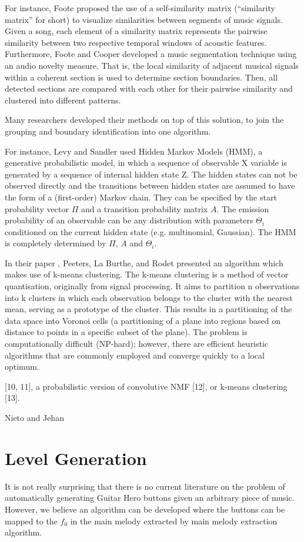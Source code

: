For instance, Foote \cite{Foote} proposed the use of a self-similarity matrix (“similarity matrix” for short) to visualize similarities between segments of music signals. Given a song, each element of a similarity matrix represents the pairwise similarity between two respective temporal windows of acoustic features. Furthermore, Foote and Cooper \cite{FooteCooper} developed a music segmentation technique using an audio novelty measure. That is, the local similarity of adjacent musical signals within a coherent section is used to determine section boundaries. Then, all detected sections are compared with each other for their pairwise similarity and clustered into different patterns.

Many researchers developed their methods on top of this solution, to join the grouping and boundary identification into one algorithm. 

For instance, Levy and Sandler used Hidden Markov Models (HMM), a generative probabilistic model, in which a sequence of observable X variable is generated by a sequence of internal hidden state Z. The hidden states can not be observed directly and the transitions between hidden states are assumed to have the form of a (first-order) Markov chain. They can be specified by the start probability vector $\Pi$ and a transition probability matrix $A$. The emission probability of an observable can be any distribution with parameters $\Theta_{i}$ conditioned on the current hidden state (e.g. multinomial, Gaussian). The HMM is completely determined by $\Pi$, $A$ and $\Theta_{i}$.

In their paper \cite{Peeters}, Peeters, La Burthe, and Rodet presented an algorithm which makes use of k-means clustering. The k-means clustering is a method of vector quantisation, originally from signal processing. It aims to partition n observations into k clusters in which each observation belongs to the cluster with the nearest mean, serving as a prototype of the cluster. This results in a partitioning of the data space into Voronoi cells (a partitioning of a plane into regions based on distance to points in a specific subset of the plane).
The problem is computationally difficult (NP-hard); however, there are efficient heuristic algorithms that are commonly employed and converge quickly to a local optimum.







 [10, 11], a probabilistic version of convolutive NMF [12], or k-means clustering [13].

 Nieto and Jehan \cite{Nieto}



\vspace{20pt}

\section{Level Generation}
It is not really surprising that there is no current literature on the problem of automatically generating Guitar Hero buttons given an arbitrary piece of music.
However, we believe an algorithm can be developed where the buttons can be mapped to the $f_{0}$ in the main melody extracted by main melody extraction algorithm.